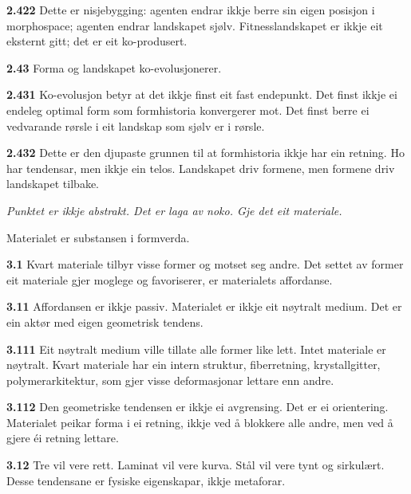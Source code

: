 \documentclass[11pt, a4paper]{article}
\newcommand{\prop}[1]{\bigskip\noindent{\Large\textbf{\textcolor{propcolor}{#1}}}\quad}
\newcommand{\subprop}[1]{\medskip\noindent\textbf{#1}\quad}
\begin{document}
\subprop{2.422} Dette er nisjebygging: agenten endrar ikkje berre sin eigen posisjon i morphospace; agenten endrar landskapet sj\o lv. Fitnesslandskapet er ikkje eit eksternt gitt; det er eit ko-produsert.

\subprop{2.43} Forma og landskapet ko-evolusjonerer.

\subprop{2.431} Ko-evolusjon betyr at det ikkje finst eit fast endepunkt. Det finst ikkje ei endeleg optimal form som formhistoria konvergerer mot. Det finst berre ei vedvarande r\o rsle i eit landskap som sj\o lv er i r\o rsle.

\subprop{2.432} Dette er den djupaste grunnen til at formhistoria ikkje har ein retning. Ho har tendensar, men ikkje ein telos. Landskapet driv formene, men formene driv landskapet tilbake.



\vspace{1.5em}
\begin{center}
\emph{Punktet er ikkje abstrakt. Det er laga av noko. Gje det eit materiale.}
\end{center}
\vspace{1.5em}



\prop{3} Materialet er substansen i formverda.

\subprop{3.1} Kvart materiale tilbyr visse former og motset seg andre. Det settet av former eit materiale gjer moglege og favoriserer, er materialets affordanse.

\subprop{3.11} Affordansen er ikkje passiv. Materialet er ikkje eit n\o ytralt medium. Det er ein akt\o r med eigen geometrisk tendens.

\subprop{3.111} Eit n\o ytralt medium ville tillate alle former like lett. Intet materiale er n\o ytralt. Kvart materiale har ein intern struktur, fiberretning, krystallgitter, polymerarkitektur, som gjer visse deformasjonar lettare enn andre.

\subprop{3.112} Den geometriske tendensen er ikkje ei avgrensing. Det er ei orientering. Materialet peikar forma i ei retning, ikkje ved \aa{} blokkere alle andre, men ved \aa{} gjere \'ei retning lettare.

\subprop{3.12} Tre vil vere rett. Laminat vil vere kurva. St\aa l vil vere tynt og sirkul\ae rt. Desse tendensane er fysiske eigenskapar, ikkje metaforar.
\end{document}
